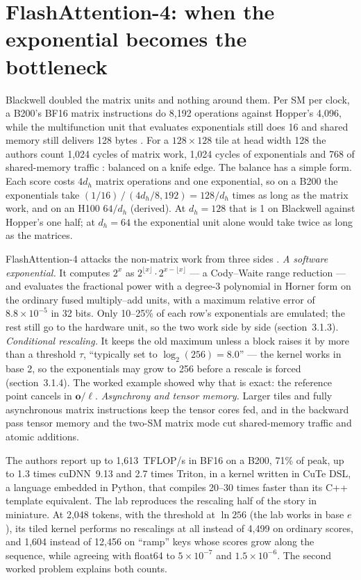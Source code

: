 \section{FlashAttention-4: when the exponential becomes the bottleneck}

Blackwell doubled the matrix units and nothing around them. Per SM per clock, a
B200's BF16 matrix instructions do 8,192 operations against Hopper's 4,096,
while the multifunction unit that evaluates exponentials still does 16 and
shared memory still delivers 128 bytes
\cite[section~2.2]{zadouri2026flashattention4}. For a $128 \times 128$ tile at
head width 128 the authors count 1,024 cycles of matrix work, 1,024 cycles of
exponentials and 768 of shared-memory traffic
\cite[section~3.1.1]{zadouri2026flashattention4}: balanced on a knife edge. The
balance has a simple form. Each score costs $4d_h$ matrix operations and one
exponential, so on a B200 the exponentials take
$(1/16)\,/\,(4d_h/8{,}192) = 128/d_h$ times as long as the matrix work, and on an
H100 $64/d_h$ (derived). At $d_h = 128$ that is 1 on Blackwell against Hopper's
one half; at $d_h = 64$ the exponential unit alone would take twice as long as
the matrices.

FlashAttention-4 attacks the non-matrix work from three sides
\cite{zadouri2026flashattention4}. \emph{A software exponential.} It computes
$2^x$ as $2^{\lfloor x \rfloor} \cdot 2^{x - \lfloor x \rfloor}$ --- a
Cody--Waite range reduction --- and evaluates the fractional power with a
degree-3 polynomial in Horner form on the ordinary fused multiply--add units,
with a maximum relative error of $8.8 \times 10^{-5}$ in 32 bits. Only 10--25\%
of each row's exponentials are emulated; the rest still go to the hardware
unit, so the two work side by side (section~3.1.3). \emph{Conditional
rescaling.} It keeps the old maximum unless a block raises it by more than a
threshold $\tau$, ``typically set to $\log_2(256) = 8.0$'' --- the kernel works
in base 2, so the exponentials may grow to 256 before a rescale is forced
(section~3.1.4). The worked example showed why that is exact: the reference
point cancels in $\mathbf{o}/\ell$. \emph{Asynchrony and tensor memory.}
Larger tiles and fully asynchronous matrix instructions keep the tensor cores
fed, and in the backward pass tensor memory and the two-SM matrix mode cut
shared-memory traffic and atomic additions.

The authors report up to 1,613~TFLOP/s in BF16 on a B200, 71\% of peak, up to
1.3 times cuDNN~9.13 and 2.7 times Triton, in a kernel written in CuTe DSL, a
language embedded in Python, that compiles 20--30 times faster than its C++
template equivalent. The lab reproduces the rescaling half of the story in
miniature. At 2,048 tokens, with the threshold at $\ln 256$ (the lab works in
base $e$), its tiled kernel performs no rescalings at all instead of 4,499 on
ordinary scores, and 1,604 instead of 12,456 on ``ramp'' keys whose scores grow
along the sequence, while agreeing with float64 to $5\times10^{-7}$ and
$1.5\times10^{-6}$. The second worked problem explains both counts.

